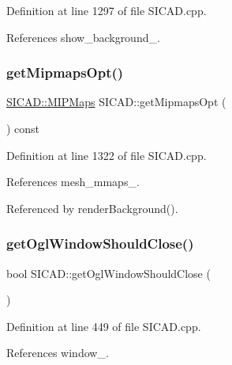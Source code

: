 Definition at line 1297 of file S\+I\+C\+A\+D.\+cpp.



References show\+\_\+background\+\_\+.

\mbox{\label{classSICAD_a8033a99745f595ea5205e3830cabc389}} 
\subsubsection{\texorpdfstring{get\+Mipmaps\+Opt()}{getMipmapsOpt()}}
{\footnotesize\ttfamily \mbox{\hyperlink{classSICAD_a7e092dede6f660355462d6d548214198}{S\+I\+C\+A\+D\+::\+M\+I\+P\+Maps}} S\+I\+C\+A\+D\+::get\+Mipmaps\+Opt (\begin{DoxyParamCaption}{ }\end{DoxyParamCaption}) const}



Definition at line 1322 of file S\+I\+C\+A\+D.\+cpp.



References mesh\+\_\+mmaps\+\_\+.



Referenced by render\+Background().

\mbox{\label{classSICAD_aaf003ab2ac8bc5ebdef6611ca1547e73}} 
\subsubsection{\texorpdfstring{get\+Ogl\+Window\+Should\+Close()}{getOglWindowShouldClose()}}
{\footnotesize\ttfamily bool S\+I\+C\+A\+D\+::get\+Ogl\+Window\+Should\+Close (\begin{DoxyParamCaption}{ }\end{DoxyParamCaption})}



Definition at line 449 of file S\+I\+C\+A\+D.\+cpp.



References window\+\_\+.

\mbox{\label{classSICAD_adb0158ae3b9e5741df2fae4d50280809}} 
